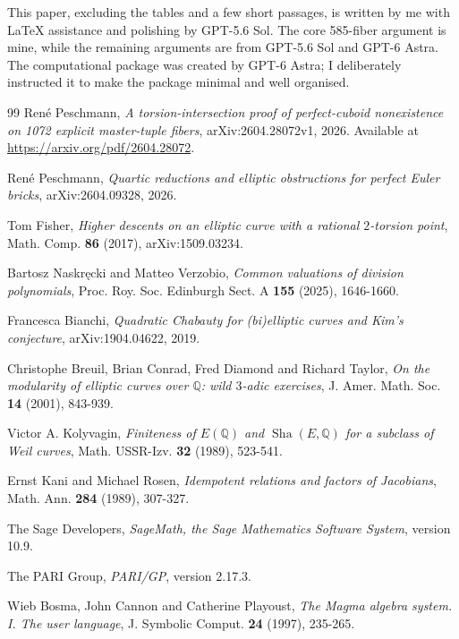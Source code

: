 \documentclass[11pt,a4paper]{amsart}
\newcommand{\Q}{\mathbb Q}
\newcommand{\Sha}{\operatorname{\mathrm{Sha}}}
\begin{document}
This paper, excluding the tables and a few short passages, is written by me with LaTeX assistance and polishing by GPT-5.6 Sol. The core 585-fiber argument is mine, while the remaining arguments are from GPT-5.6 Sol and GPT-6 Astra. The computational package was created by GPT-6 Astra; I deliberately instructed it to make the package minimal and well organised.

\begin{thebibliography}{99}
Ren\'e Peschmann,
\emph{A torsion-intersection proof of perfect-cuboid nonexistence on 1072 explicit master-tuple fibers},
arXiv:2604.28072v1, 2026.
Available at \url{https://arxiv.org/pdf/2604.28072}.

Ren\'e Peschmann,
\emph{Quartic reductions and elliptic obstructions for perfect Euler bricks},
arXiv:2604.09328, 2026.

Tom Fisher,
\emph{Higher descents on an elliptic curve with a rational $2$-torsion point},
Math. Comp. \textbf{86} (2017), arXiv:1509.03234.

Bartosz Naskr\k{e}cki and Matteo Verzobio,
\emph{Common valuations of division polynomials},
Proc. Roy. Soc. Edinburgh Sect. A \textbf{155} (2025), 1646-1660.

Francesca Bianchi,
\emph{Quadratic Chabauty for (bi)elliptic curves and Kim's conjecture},
arXiv:1904.04622, 2019.

Christophe Breuil, Brian Conrad, Fred Diamond and Richard Taylor,
\emph{On the modularity of elliptic curves over $\Q$: wild $3$-adic exercises},
J. Amer. Math. Soc. \textbf{14} (2001), 843-939.

Victor A. Kolyvagin,
\emph{Finiteness of $E(\Q)$ and $\Sha(E,\Q)$ for a subclass of Weil curves},
Math. USSR-Izv. \textbf{32} (1989), 523-541.

Ernst Kani and Michael Rosen,
\emph{Idempotent relations and factors of Jacobians},
Math. Ann. \textbf{284} (1989), 307-327.

The Sage Developers,
\emph{SageMath, the Sage Mathematics Software System}, version 10.9.

The PARI Group,
\emph{PARI/GP}, version 2.17.3.

Wieb Bosma, John Cannon and Catherine Playoust,
\emph{The Magma algebra system. I. The user language},
J. Symbolic Comput. \textbf{24} (1997), 235-265.
\end{thebibliography}
\end{document}
